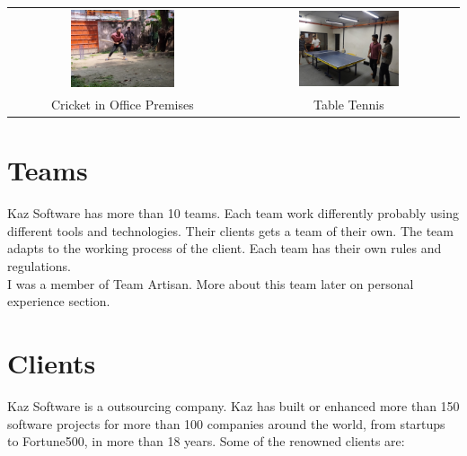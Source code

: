 \setlength{\tabcolsep}{4pt}
\begin{center}
    \begin{tabular}{cc}
    \includegraphics[width=0.475\textwidth]{images/Chapter2/cricket.jpeg} & \includegraphics[width=0.475\textwidth]{images/Chapter2/tt.jpeg} \\
    Cricket in Office Premises & Table Tennis \\
    \end{tabular}
\end{center}

\section{Teams}

Kaz Software has more than 10 teams.
Each team work differently probably using different tools and technologies.
Their clients gets a team of their own.
The team adapts to the working process of the client.
Each team has their own rules and regulations.\\

I was a member of Team Artisan.
More about this team later on personal experience section.

\section{Clients}

Kaz Software is a outsourcing company.
Kaz has built or enhanced more than 150 software projects for more than 100 companies around the world, from startups to Fortune500, in more than 18 years.
Some of the renowned clients are:

